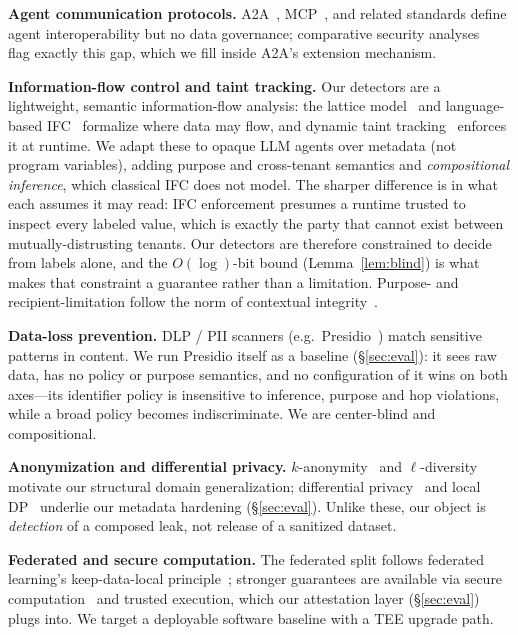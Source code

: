 \documentclass[conference,compsoc]{IEEEtran}
\begin{document}
\noindent\textbf{Agent communication protocols.} A2A~\cite{a2a}, MCP~\cite{mcp},
and related standards define agent interoperability but no data governance;
comparative security analyses~\cite{protosec,protoexploit} flag exactly this gap,
which we fill inside A2A's extension mechanism.

\noindent\textbf{Information-flow control and taint tracking.} Our detectors are a
lightweight, semantic information-flow analysis: the lattice model~\cite{denning76}
and language-based IFC~\cite{sabelfeld03} formalize where data may flow, and
dynamic taint tracking~\cite{taintdroid} enforces it at runtime. We adapt these to
opaque LLM agents over metadata (not program variables), adding purpose and
cross-tenant semantics and \emph{compositional inference}, which classical IFC
does not model. The sharper difference is in what each assumes it may read: IFC
enforcement presumes a runtime trusted to inspect every labeled value, which is
exactly the party that cannot exist between mutually-distrusting tenants. Our
detectors are therefore constrained to decide from labels alone, and the
$O(\log)$-bit bound (Lemma~\ref{lem:blind}) is what makes that constraint a
guarantee rather than a limitation. Purpose- and recipient-limitation follow the norm of contextual
integrity~\cite{ci}.

\noindent\textbf{Data-loss prevention.} DLP / PII scanners (e.g.\
Presidio~\cite{presidio}) match sensitive patterns in content. We run Presidio
itself as a baseline (\S\ref{sec:eval}): it sees raw data, has no policy or purpose
semantics, and no configuration of it wins on both axes---its identifier policy is
insensitive to inference, purpose and hop violations, while a broad policy becomes
indiscriminate. We are center-blind and compositional.

\noindent\textbf{Anonymization and differential privacy.} $k$-anonymity~\cite{ksweeney}
and $\ell$-diversity~\cite{ldiv} motivate our structural domain generalization;
differential privacy~\cite{dwork06,dworkroth} and local DP~\cite{rappor} underlie
our metadata hardening (\S\ref{sec:eval}). Unlike these, our object is \emph{detection} of a
composed leak, not release of a sanitized dataset.

\noindent\textbf{Federated and secure computation.} The federated split follows
federated learning's keep-data-local principle~\cite{fedavg}; stronger guarantees
are available via secure computation~\cite{yao} and trusted execution, which our
attestation layer (\S\ref{sec:eval}) plugs into. We target a deployable software baseline with a
TEE upgrade path.
\end{document}

